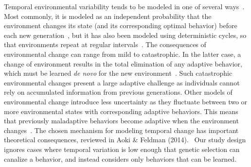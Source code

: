 \documentclass[letterpaper,11.5pt]{scrartcl}
\begin{document}
Temporal environmental variability tends to be modeled in one of 
several ways~\citep{aoki2014evolution}. Most commonly, it is modeled
as an independent probability that the environment changes its state (and its corresponding optimal behavior) before each new generation~\citep{BoydRicherson1985,Rogers1988,Feldman1996,McElreath2005,Enquist2007,perreault2012bayesian,aoki2014evolution}, but
it has also been modeled using deterministic cycles, so that environments repeat at regular intervals~\citep{Feldman1996, aoki2014evolution}.
The consequences of environmental change can range from mild to catastrophic. In the latter case, a change of environment results in the total elimination of any adaptive behavior, which must be learned \emph{de novo} for the new environment~\citep{Rogers1988}. Such catastrophic environmental changes present
a large adaptive challenge as individuals cannot rely on accumulated information
from previous generations. Other models of environmental change introduce less
uncertainty as they fluctuate between two or more environmental states with corresponding adaptive behaviors. This means that previously maladaptive
behaviors become adaptive when the environment changes~\citep{perreault2012bayesian}. The chosen mechanism for modeling temporal change has important theoretical consequences, reviewed in Aoki \& Feldman (2014).~\nocite{aoki2014evolution} Our study design ignores cases where temporal variation is low enough that genetic selection can canalize a behavior, and instead considers only behaviors that can be learned.
\end{document}
